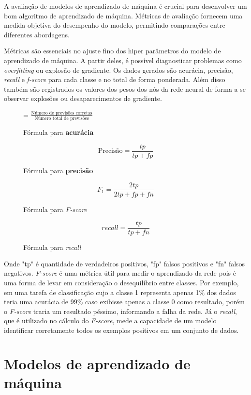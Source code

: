 A avaliação de modelos de aprendizado de máquina é crucial para desenvolver um bom algoritmo de aprendizado de máquina. Métricas de avaliação fornecem uma medida objetiva do desempenho do modelo, permitindo comparações entre diferentes abordagens.

Métricas são essenciais no ajuste fino dos hiper parâmetros do modelo de aprendizado de máquina. A partir deles, é possível diagnosticar problemas como \textit{overfitting} ou explosão de gradiente. Os dados gerados são acurácia, precisão, \textit{recall} e \textit{f-score} para cada classe e no total de forma ponderada. Além disso também são registrados os valores dos pesos dos nós da rede neural de forma a se observar explosões ou desaparecimentos de gradiente.

\begin{figure}[ht]
     = $\frac{\text{Número de previsões corretas}}{\text{Número total de previsões}}$
    \centering
    \caption{Fórmula para \textbf{acurácia}}
\end{figure}

\begin{figure}[ht]
    \[\text{Precisão} = \frac{tp}{tp+fp}\]
    \centering
    \caption{Fórmula para \textbf{precisão}}
\end{figure}


\begin{figure}[ht]
    \[F_{1} = \frac{2tp}{2tp + fp + fn}\]
    \caption{Fórmula para \textit{F-score}}
\end{figure}

\begin{figure}[ht]
    \[ \textit{recall} =  \frac{tp}{tp + fn}\]
    \caption{Fórmula para \textit{recall}}
\end{figure}

Onde "tp" é quantidade de verdadeiros positivos, "fp" falsos positivos e "fn" falsos negativos. \textit{F-score} é uma métrica útil para medir o aprendizado da rede pois é uma forma de levar em consideração o desequilíbrio entre classes. Por exemplo, em uma tarefa de classificação cujo a classe 1 representa apenas 1\% dos dados teria uma acurácia de 99\% caso exibisse apenas a classe 0 como resultado, porém o \textit{F-score} traria um resultado péssimo, informando a falha da rede. Já o \textit{recall}, que é utilizado no cálculo do \textit{F-score}, mede a capacidade de um modelo identificar corretamente todos os exemplos positivos em um conjunto de dados.

\section{Modelos de aprendizado de máquina}

